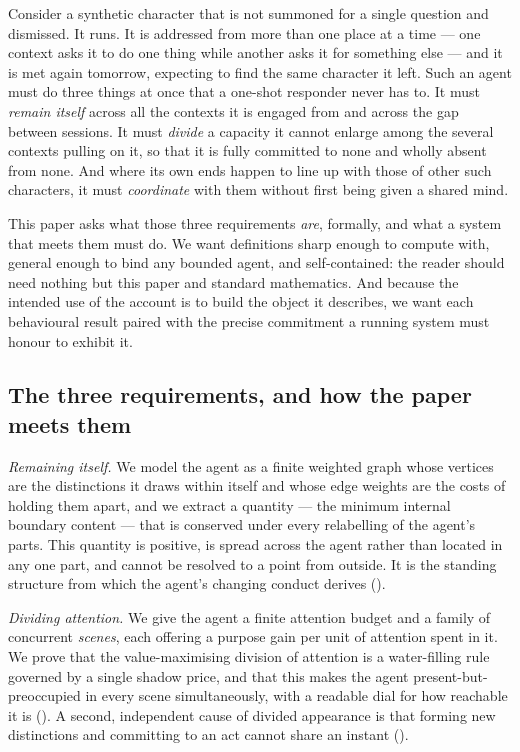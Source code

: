 \documentclass[11pt,twocolumn,a4paper]{article}
\begin{document}
Consider a synthetic character that is not summoned for a single question
and dismissed. It runs. It is addressed from more than one place at a
time --- one context asks it to do one thing while another asks it for
something else --- and it is met again tomorrow, expecting to find the
same character it left. Such an agent must do three things at once that a
one-shot responder never has to. It must \emph{remain itself} across all
the contexts it is engaged from and across the gap between sessions. It
must \emph{divide} a capacity it cannot enlarge among the several contexts
pulling on it, so that it is fully committed to none and wholly absent
from none. And where its own ends happen to line up with those of other
such characters, it must \emph{coordinate} with them without first being
given a shared mind.

This paper asks what those three requirements \emph{are}, formally, and
what a system that meets them must do. We want definitions sharp enough to
compute with, general enough to bind any bounded agent, and self-contained:
the reader should need nothing but this paper and standard mathematics.
And because the intended use of the account is to build the object it
describes, we want each behavioural result paired with the precise
commitment a running system must honour to exhibit it.

\subsection{The three requirements, and how the paper meets them}

\emph{Remaining itself.} We model the agent as a finite weighted graph
whose vertices are the distinctions it draws within itself and whose edge
weights are the costs of holding them apart, and we extract a quantity
--- the minimum internal boundary content --- that is conserved under
every relabelling of the agent's parts. This quantity is positive, is
spread across the agent rather than located in any one part, and cannot
be resolved to a point from outside. It is the standing structure from
which the agent's changing conduct derives ().

\emph{Dividing attention.} We give the agent a finite attention budget and
a family of concurrent \emph{scenes}, each offering a purpose gain per
unit of attention spent in it. We prove that the value-maximising division
of attention is a water-filling rule governed by a single shadow price,
and that this makes the agent present-but-preoccupied in every scene
simultaneously, with a readable dial for how reachable it is
(). A second, independent cause of divided appearance
is that forming new distinctions and committing to an act cannot share an
instant ().
\end{document}
